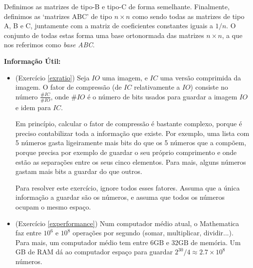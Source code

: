 \documentclass{article}
\begin{document}
Definimos as matrizes de tipo-B e tipo-C de forma semelhante. Finalmente, definimos as `matrizes ABC' de tipo $n \times n$ como sendo todas as matrizes de tipo A, B e C, juntamente com a matriz de coeficientes constantes iguais a $1/n$. O conjunto de todas estas forma uma base ortonormada das matrizes $n \times n$, a que nos referimos como \emph{base ABC}.

\medskip

\textbf{Informação Útil:}
\begin{itemize}
    \item (Exercício \ref{exratio})
Seja $IO$ uma imagem, e $IC$ uma versão comprimida da imagem. O fator de compressão (de $IC$ relativamente a $IO$) consiste no número $\frac{\#IC}{\#IO}$, onde $\#IO$ é o número de bits usados para guardar a imagem $IO$ e idem para $IC$.    

Em princípio, calcular o fator de compressão é bastante complexo, porque é preciso contabilizar toda a informação que existe. Por exemplo, uma lista com 5 números gasta ligeiramente mais bits do que os 5 números que a compõem, porque precisa por exemplo de guardar o seu próprio comprimento e onde estão as separações entre os seus cinco elementos. Para mais, alguns números gastam mais bits a guardar do que outros.

Para resolver este exercício, ignore todos esses fatores. Assuma que a única informação a guardar são os números, e assuma que todos os números ocupam o mesmo espaço.


\item (Exercício \ref{experformance}) Num computador médio atual, o Mathematica faz entre $10^6$ e $10^8$ operações por segundo (somar, multiplicar, dividir...). Para mais, um computador médio tem entre $6 \mathrm{GB}$ e $32 \mathrm{GB}$ de memória. Um GB de RAM dá ao computador espaço para guardar $2^{30} / 4 \approx 2.7 \times 10^8$ números.
\end{itemize}
\end{document}
